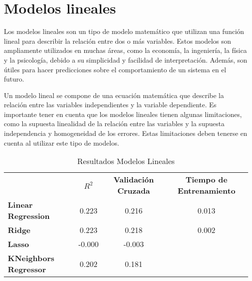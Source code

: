 \section{Modelos lineales}

Los modelos lineales son un tipo de modelo matemático que utilizan una función lineal para describir la relación entre dos o más variables. Estos modelos son ampliamente utilizados en muchas áreas, como la economía, la ingeniería, la física y la psicología, debido a su simplicidad y facilidad de interpretación. Además, son útiles para hacer predicciones sobre el comportamiento de un sistema en el futuro. 
\newline

Un modelo lineal se compone de una ecuación matemática que describe la relación entre las variables independientes y la variable dependiente. Es importante tener en cuenta que los modelos lineales tienen algunas limitaciones, como la supuesta linealidad de la relación entre las variables y la supuesta independencia y homogeneidad de los errores. Estas limitaciones deben tenerse en cuenta al utilizar este tipo de modelos.







\begin{table}[h]
    \centering
    \begin{tabular}{lccc}
                                        & \textbf{$R^2$} & \textbf{Validación Cruzada}  & \textbf{Tiempo de Entrenamiento} \\
        \textbf{Linear Regression}      &  0.223         & 0.216                        & 0.013 \\
        \textbf{Ridge}                  &  0.223         & 0.218                        & 0.002 \\
        \textbf{Lasso}                  &  -0.000        & -0.003                       & \\
        \textbf{KNeighbors Regressor}   &  0.202        & 0.181                         &
    \end{tabular}
    \caption{Resultados Modelos Lineales}
    \label{Modelos-Lineales-Resultados}
\end{table}



\newpage